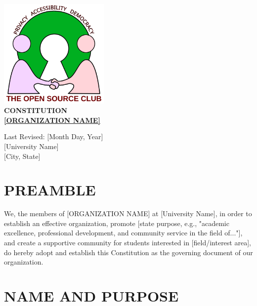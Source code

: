 \documentclass[12pt,letterpaper]{article}
\begin{document}
\begin{titlepage}
\begin{center}
\vspace*{1cm}

\includegraphics[width=0.4\textwidth]{logo.png}\\[2cm]

{\LARGE\bfseries\color{darkblue} CONSTITUTION\\[0.5cm]}
{\huge\bfseries\color{darkblue} \underline{[ORGANIZATION NAME]}\\[1cm]}

{\large Last Revised: [Month Day, Year]}\\[3cm]

\vfill
{\large [University Name]}\\
{\large [City, State]}\\[1cm]
\end{center}
\end{titlepage}

\tableofcontents
\clearpage

\section*{PREAMBLE}

\begin{hangparas}{0.5in}{1}
We, the members of [ORGANIZATION NAME] at [University Name], in order to establish an effective organization, promote [state purpose, e.g., "academic excellence, professional development, and community service in the field of..."], and create a supportive community for students interested in [field/interest area], do hereby adopt and establish this Constitution as the governing document of our organization.
\end{hangparas}

\section{NAME AND PURPOSE}
\end{document}
